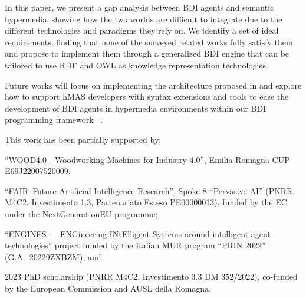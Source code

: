 \documentclass[
]{ceurart}
\begin{document}
In this paper, we present a gap analysis between \ac{BDI} agents and semantic hypermedia,
showing how the two worlds are difficult to integrate due to the different technologies and paradigms they rely on.
%
We identify a set of ideal requirements, finding that none of the surveyed related works fully satisfy them
and propose to implement them through a generalized \ac{BDI} engine that can be tailored to use \ac{RDF} and \ac{OWL} as knowledge representation technologies.

Future works will focus on implementing the architecture proposed in 
and explore how to support \ac{hMAS} developers with syntax extensions and tools to ease the development of \ac{BDI} agents in hypermedia environments within our \ac{BDI} programming framework \jakta{}~\cite{baiardi2024sncs}.




\begin{acknowledgments}
  This work has been partially supported by:
  \begin{inlinelist}
      \item ``WOOD4.0 - Woodworking Machines for Industry 4.0'',
          Emilia-Romagna CUP E69J22007520009;
      \item ``FAIR--Future Artificial Intelligence Research'',
          Spoke 8 ``Pervasive AI''
          (PNRR, M4C2, Investimento 1.3, Partenariato Esteso PE00000013),
          funded by the EC under the NextGenerationEU programme;
      \item “ENGINES — ENGineering INtElligent Systems around intelligent agent technologies” project funded by the Italian MUR program ``PRIN 2022'' (G.A.\ 20229ZXBZM),
      and
      \item 2023 PhD scholarship
          (PNRR M4C2, Investimento 3.3 DM 352/2022),
          co-funded by the European Commission
          and AUSL della Romagna.
  \end{inlinelist}
\end{acknowledgments}
\end{document}
